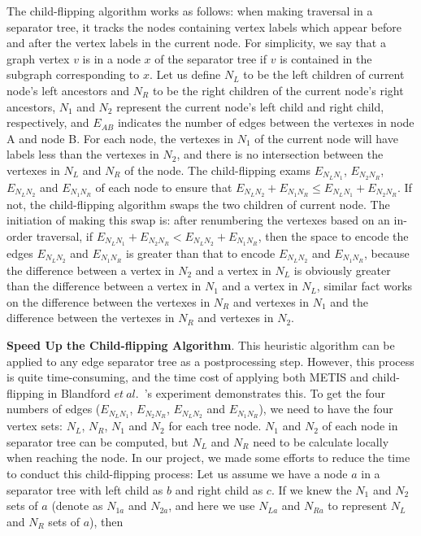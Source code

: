\documentclass[12pt,glossary]{dalthesis}
\begin{document}
\bigskip
\bigskip

The child-flipping algorithm works as follows: when making traversal in a separator tree, it tracks the nodes containing vertex labels which appear before and after the vertex labels in the current node. For simplicity, we say that a graph vertex $v$ is in a node $x$ of the separator tree if $v$ is contained in the subgraph corresponding to $x$. Let us define $N_{L}$ to be the left children of current node's left ancestors and $N_{R}$ to be the right children of the current node's right ancestors, $N_{1}$ and $N_{2}$ represent the current node's left child and right child, respectively, and $E_{AB}$ indicates the number of edges between the vertexes in node A and node B. For each node, the vertexes in $N_{1}$ of the current node will have labels less than the vertexes in $N_{2}$, and there is no intersection between the vertexes in $N_{L}$ and $N_{R}$ of the node. The child-flipping exams $E_{N_{L}N_{1}}$, $E_{N_{2}N_{R}}$, $E_{N_{L}N_{2}}$ and $E_{N_{1}N_{R}}$ of each node to ensure that $E_{N_{L}N_{2}} + E_{N_{1}N_{R}} \leq E_{N_{L}N_{1}} + E_{N_{2}N_{R}}$. If not, the child-flipping algorithm swaps the two children of current node. The initiation of making this swap is: after renumbering the vertexes based on an in-order traversal, if $E_{N_{L}N_{1}} + E_{N_{2}N_{R}} < E_{N_{L}N_{2}} + E_{N_{1}N_{R}}$, then the space to encode the edges $E_{N_{L}N_{2}}$ and $E_{N_{1}N_{R}}$ is greater than that to encode $E_{N_{L}N_{2}}$ and $E_{N_{1}N_{R}}$, because the difference between a vertex in $N_{2}$ and a vertex in $N_{L}$ is obviously greater than the difference between a vertex in $N_{1}$ and a vertex in $N_{L}$, similar fact works on the difference between the vertexes in $N_{R}$ and vertexes in $N_{1}$ and the difference between the vertexes in $N_{R}$ and vertexes in $N_{2}$.

\bigskip
\bigskip

\textbf{Speed Up the Child-flipping Algorithm}. This heuristic algorithm can be applied to any edge separator tree as a postprocessing step. However, this process is quite time-consuming, and the time cost of applying both METIS and child-flipping in Blandford $et \ al.$~\cite{compact-representation}'s experiment demonstrates this. To get the four numbers of edges ($E_{N_{L}N_{1}}$, $E_{N_{2}N_{R}}$, $E_{N_{L}N_{2}}$ and $E_{N_{1}N_{R}}$), we need to have the four vertex sets: $N_{L}$, $N_{R}$, $N_{1}$ and $N_{2}$ for each tree node. $N_{1}$ and $N_{2}$ of each node in separator tree can be computed, but $N_{L}$ and $N_{R}$ need to be calculate locally when reaching the node. In our project, we made some efforts to reduce the time to conduct this child-flipping process: Let us assume we have a node $a$ in a separator tree with left child as $b$ and right child as $c$. If we knew the $N_{1}$ and $N_{2}$ sets of $a$ (denote as $N_{1a}$ and $N_{2a}$, and here we use $N_{La}$ and $N_{Ra}$ to represent $N_{L}$ and $N_{R}$ sets of $a$), then
\end{document}
